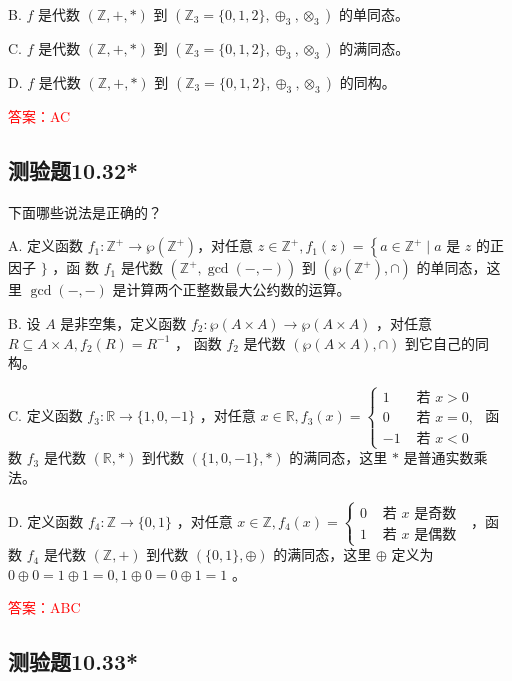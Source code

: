 \documentclass[UTF8, heading=true]{ctexart}
\begin{document}
B. $f$ 是代数 $(\mathbb{Z},+, *)$ 到 $\left(\mathbb{Z}_3=\{0,1,2\}, \oplus_3, \otimes_3\right)$ 的单同态。

C. $f$ 是代数 $(\mathbb{Z},+, *)$ 到 $\left(\mathbb{Z}_3=\{0,1,2\}, \oplus_3, \otimes_3\right)$ 的满同态。

D. $f$ 是代数 $(\mathbb{Z},+, *)$ 到 $\left(\mathbb{Z}_3=\{0,1,2\}, \oplus_3, \otimes_3\right)$ 的同构。

\textcolor{red}{答案：AC}

\subsection{测验题10.32*}

下面哪些说法是正确的？

A. 定义函数 $f_1: \mathbb{Z}^{+} \rightarrow \wp\left(\mathbb{Z}^{+}\right)$，对任意 $z \in \mathbb{Z}^{+}, f_1(z)=\left\{a \in \mathbb{Z}^{+} \mid a\right.$ 是 $z$ 的正因子 $\}$ ，函
数 $f_1$ 是代数 $\left(\mathbb{Z}^{+}, \operatorname{gcd}(-,-)\right)$ 到 $\left(\wp\left(\mathbb{Z}^{+}\right), \cap\right)$ 的单同态，这里 $\operatorname{gcd}(-,-)$ 是计算两个正整数最大公约数的运算。

B. 设 $A$ 是非空集，定义函数 $f_2: \wp(A \times A) \rightarrow \wp(A \times A)$ ，对任意 $R \subseteq A \times A, f_2(R)=R^{-1}$ ，
函数 $f_2$ 是代数 $(\wp(A \times A), \cap)$ 到它自己的同构。

C. 定义函数 $f_3: \mathbb{R} \rightarrow\{1,0,-1\}$ ，对任意 $x \in \mathbb{R}, f_3(x)=\left\{\begin{array}{ll}1 & \text { 若 } x>0 \\ 0 & \text { 若 } x=0, \\ -1 & \text { 若 } x<0\end{array}\right.$ 函数 $f_3$ 是代数 $(\mathbb{R}, *)$ 到代数 $(\{1,0,-1\}, *)$ 的满同态，这里 $*$ 是普通实数乘法。

D. 定义函数 $f_4: \mathbb{Z} \rightarrow\{0,1\}$ ，对任意 $x \in \mathbb{Z}, f_4(x)=\left\{\begin{array}{ll}0 & \text { 若 } x \text { 是奇数 } \\ 1 & \text { 若 } x \text { 是偶数 }\end{array}\right.$ ，函数 $f_4$ 是代数 $(\mathbb{Z},+)$ 到代数 $(\{0,1\}, \oplus)$ 的满同态，这里 $\oplus$ 定义为 $0 \oplus 0=1 \oplus 1=0,1 \oplus 0=0 \oplus 1=1$ 。


\textcolor{red}{答案：ABC}

\subsection{测验题10.33*}
\end{document}
